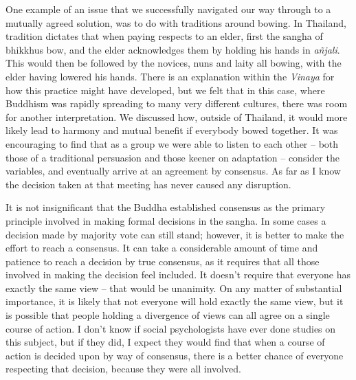 One example of an issue that we successfully navigated our way through
to a mutually agreed solution, was to do with traditions around bowing.
In Thailand, tradition dictates that when paying respects to an elder,
first the sangha of bhikkhus bow, and the elder acknowledges them by
holding his hands in \emph{añjali}. This would then be followed by the
novices, nuns and laity all bowing, with the elder having lowered his
hands. There is an explanation within the \emph{Vinaya} for how this
practice might have developed, but we felt that in this case, where
Buddhism was rapidly spreading to many very different cultures, there
was room for another interpretation. We discussed how, outside of
Thailand, it would more likely lead to harmony and mutual benefit if
everybody bowed together. It was encouraging to find that as a group we
were able to listen to each other -- both those of a traditional
persuasion and those keener on adaptation -- consider the variables, and
eventually arrive at an agreement by consensus. As far as I know the
decision taken at that meeting has never caused any disruption.

It is not insignificant that the Buddha established consensus as the
primary principle involved in making formal decisions in the sangha. In
some cases a decision made by majority vote can still stand; however, it
is better to make the effort to reach a consensus. It can take a
considerable amount of time and patience to reach a decision by true
consensus, as it requires that all those involved in making the decision
feel included. It doesn't require that everyone has exactly the same
view -- that would be unanimity. On any matter of substantial
importance, it is likely that not everyone will hold exactly the same
view, but it is possible that people holding a divergence of views can
all agree on a single course of action. I don't know if social
psychologists have ever done studies on this subject, but if they did, I
expect they would find that when a course of action is decided upon by
way of consensus, there is a better chance of everyone respecting that
decision, because they were all involved.

